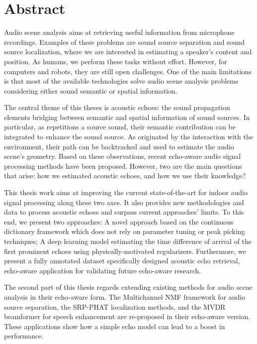 \chapter*{Abstract}

{   \small

    Audio scene analysis aims at retrieving useful information from microphone recordings.
    Examples of these problems are sound source separation and sound source localization, where we are interested in estimating a speaker's content and position.
    As humans, we perform these tasks without effort. However, for computers and robots, they are still open challenges.
    One of the main limitations is that most of the available technologies solve audio scene analysis problems considering either sound semantic or spatial information.

    \mynewline
    The central theme of this theses is acoustic echoes: the sound propagation elements bridging between semantic and spatial information of sound sources.
    In particular, as repetitions a source sound, their semantic contribution can be integrated to enhance the sound source.
    As originated by the interaction with the environment, their path can be backtracked and used to estimate the audio scene's geometry.
    Based on these observations, recent echo-aware audio signal processing methods have been proposed.
    However, two are the main questions that arise: how we estimated acoustic echoes, and how we use their knowledge?

    \mynewline
    This thesis work aims at improving the current state-of-the-art for indoor audio signal processing along these two axes.
    It also provides new methodologies and data to process acoustic echoes and surpass current approaches' limits.
    To this end, we present two approaches:
    A novel approach based on the  continuous dictionary framework which does not rely on parameter tuning or peak picking techniques;
    A deep learning model estimating the time difference of arrival of the first prominent echoes using physically-motivated regularizers.
    Furthermore, we present a fully annotated dataset specifically designed acoustic echo retrieval, echo-aware application for validating future echo-aware research.

    \mynewline
    The second part of this thesis regards extending existing methods for audio scene analysis in their echo-aware form.
    The Multichannel NMF framework for audio source separation, the SRP-PHAT localization methods, and the MVDR beamformer for speech enhancement
    are re-proposed in their echo-aware version. These applications show how a simple echo model can lead to a boost in performance.

}
